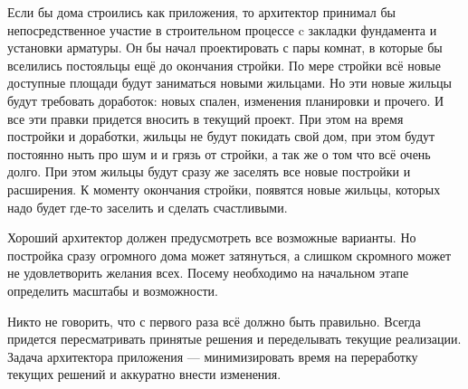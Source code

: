
Если бы дома строились как приложения, то архитектор принимал бы непосредственное участие в строительном процессе c закладки фундамента и установки арматуры.  Он бы начал проектировать с пары комнат, в которые бы вселились постояльцы ещё до окончания стройки. По мере стройки всё новые доступные площади будут заниматься новыми жильцами. Но эти новые жильцы будут требовать доработок: новых спален, изменения планировки и прочего. И все эти правки придется вносить в текущий проект. При этом на время постройки и доработки, жильцы не будут покидать свой дом, при этом будут постоянно ныть про шум и и грязь от стройки, а так же о том что всё очень долго. При этом жильцы будут сразу же заселять все новые постройки и расширения. К моменту окончания стройки, появятся новые жильцы, которых надо будет где-то заселить и сделать счастливыми.

Хороший архитектор должен предусмотреть все возможные варианты. Но постройка сразу огромного дома может затянуться, а слишком скромного может не удовлетворить желания всех. Посему необходимо на начальном этапе определить масштабы и возможности.

Никто не говорить, что с первого раза всё должно быть правильно. Всегда придется пересматривать принятые решения и переделывать текущие реализации. Задача архитектора приложения --- минимизировать время на переработку текущих решений и аккуратно внести изменения.






\clearpage